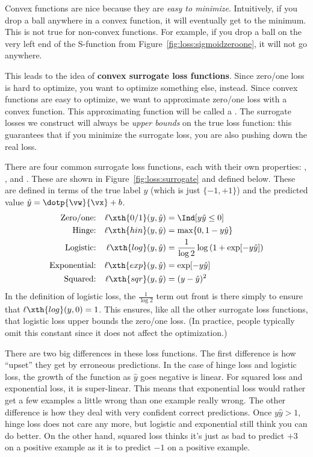 
Convex functions are nice because they are \emph{easy to minimize}.
Intuitively, if you drop a ball anywhere in a convex function, it will
eventually get to the minimum.  This is not true for non-convex
functions.  For example, if you drop a ball on the very left end of
the S-function from Figure~\ref{fig:loss:sigmoidzeroone}, it will not
go anywhere.

This leads to the idea of {\bf convex surrogate loss functions}.
Since zero/one loss is hard to optimize, you want to optimize
something else, instead.  Since convex functions are easy to optimize,
we want to approximate zero/one loss with a convex function.  This
approximating function will be called a .  The
surrogate losses we construct will always be \emph{upper bounds} on
the true loss function: this guarantees that if you minimize the
surrogate loss, you are also pushing down the real loss.


There are four common surrogate loss functions, each with their own
properties: , ,
 and .  These are
shown in Figure~\ref{fig:loss:surrogate} and defined below.  These are
defined in terms of the true label $y$ (which is just $\{-1,+1\}$) and
the predicted value $\hat y = \dotp{\vw}{\vx}+b$.
%
\begin{align}
\text{Zero/one:}    && \ell\xth{0/1}(y,\hat y) &= \Ind[y \hat y \leq 0] \\
\text{Hinge:}       && \ell\xth{hin}(y,\hat y) &= \max \{ 0, 1-y\hat y \}\\
\text{Logistic:}    && \ell\xth{log}(y,\hat y) &= \frac 1 {\log2} \log\left( 1 + \exp[-y\hat y]\right)\\
\text{Exponential:} && \ell\xth{exp}(y,\hat y) &= \exp[-y\hat y]\\
\text{Squared:}     && \ell\xth{sqr}(y,\hat y) &= (y-\hat y)^2
\end{align}
%
In the definition of logistic loss, the $\frac 1 {\log2}$ term out
front is there simply to ensure that $\ell\xth{log}(y,0) = 1$.  This
ensures, like all the other surrogate loss functions, that logistic
loss upper bounds the zero/one loss.  (In practice, people typically
omit this constant since it does not affect the optimization.)

There are two big differences in these loss functions.  The first
difference is how ``upset'' they get by erroneous predictions.  In the
case of hinge loss and logistic loss, the growth of the function as
$\hat y$ goes negative is linear.  For squared loss and exponential
loss, it is super-linear.  This means that exponential loss would
rather get a few examples a little wrong than one example really
wrong.  The other difference is how they deal with very confident
correct predictions.  Once $y\hat y>1$, hinge loss does not care any
more, but logistic and exponential still think you can do better.  On
the other hand, squared loss thinks it's just as bad to predict $+3$
on a positive example as it is to predict $-1$ on a positive example.

